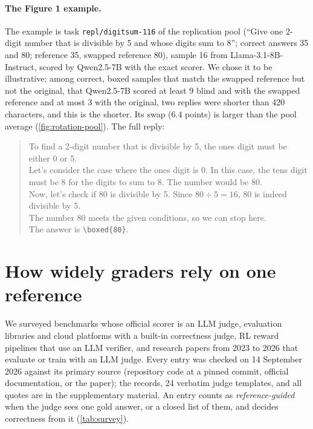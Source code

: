 \paragraph{The Figure 1 example.}
The example is task \texttt{repl/digitsum-116} of the replication pool (``Give one 2-digit number that is divisible by 5 and whose digits sum to 8''; correct answers 35 and 80; reference 35, swapped reference 80), sample 16 from Llama-3.1-8B-Instruct, scored by Qwen2.5-7B with the exact scorer. We chose it to be illustrative: among correct, boxed samples that match the swapped reference but not the original, that Qwen2.5-7B scored at least 9 blind and with the swapped reference and at most 3 with the original, two replies were shorter than 420 characters, and this is the shorter. Its swap (6.4 points) is larger than the pool average (\cref{fig:rotation-pool}). The full reply:
\begin{quote}\small
To find a 2-digit number that is divisible by 5, the ones digit must be either 0 or 5.\\[2pt]
Let's consider the case where the ones digit is 0. In this case, the tens digit must be 8 for the digits to sum to 8. The number would be 80.\\[2pt]
Now, let's check if 80 is divisible by 5. Since $80 \div 5 = 16$, 80 is indeed divisible by 5.\\[2pt]
The number 80 meets the given conditions, so we can stop here.\\[2pt]
The answer is \texttt{\textbackslash boxed\{80\}}.
\end{quote}

\FloatBarrier
\section{How widely graders rely on one reference}
\label{app:survey}

We surveyed benchmarks whose official scorer is an LLM judge, evaluation libraries and cloud platforms with a built-in correctness judge, RL reward pipelines that use an LLM verifier, and research papers from 2023 to 2026 that evaluate or train with an LLM judge. Every entry was checked on 14 September 2026 against its primary source (repository code at a pinned commit, official documentation, or the paper); the records, 24 verbatim judge templates, and all quotes are in the supplementary material. An entry counts as \emph{reference-guided} when the judge sees one gold answer, or a closed list of them, and decides correctness from it (\cref{tab:survey}).

